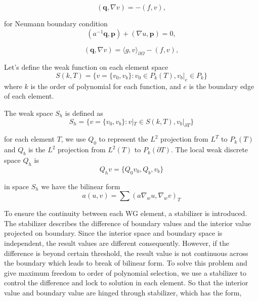 \begin{equation}
(\mathbf{q}, \nabla v) = -(f, v),
\end{equation}

for Neumann boundary condition
\begin{equation}
(a^{-1} \mathbf{q}, \mathbf{p}) + (\nabla u, \mathbf{p}) = 0,
\end{equation}

\begin{equation}
(\mathbf{q}, \nabla v) = \langle g, v \rangle_{\partial \Omega} - (f, v),
\end{equation}

Let's define the weak function on each element space
\begin{equation}
S(k, T) = \{ v = \{ v_{0}, v_{b} \} : v_{0} \in P_{k} (T), v_{b}|_{e} \in P_{k} \}
\end{equation}
where $ k $ is the order of polynomial for each function, and $ e $ is the boundary edge of each element.

The weak space $ S_{h} $ is defined as
\begin{equation}
S_{h} = \{ v = \{ v_{0}, v_{b} \} : v |_{T} \in S(k, T), v_{b} |_{\partial T} \}
\end{equation}

for each element $ T $, we use $ Q_{0} $ to represent the $ L^{2} $ projection from $ L^{T} $ to $ P_{k}(T) $ and $ Q_{b} $ is the $ L^{2} $ projection from $ L^{2}(T) $ to $ P_{k}(\partial T) $. The local weak discrete space $ Q_{h} $ is
\begin{equation}
Q_{h} v = \{ Q_{0} v_{0}, Q_{b}, v_{b} \}
\end{equation}

in space $ S_{h} $ we have the bilinear form
\begin{equation}
a(u, v) = \sum (a \nabla_{w} u, \nabla_{w} v)_{T}
\end{equation}

To ensure the continuity between each WG element, a stabilizer is introduced. The stabilizer describes the difference of boundary values and the interior value projected on boundary. Since the interior space and boundary space is independent, the result values are different consequently. However, if the difference is beyond certain threshold, the result value is not continuous across the boundary which leads to break of bilinear form. To solve this problem and give maximum freedom to order of polynomial selection, we use a stabilizer to control the difference and lock to solution in each element. So that the interior value and boundary value are hinged through stabilizer, which has the form,

